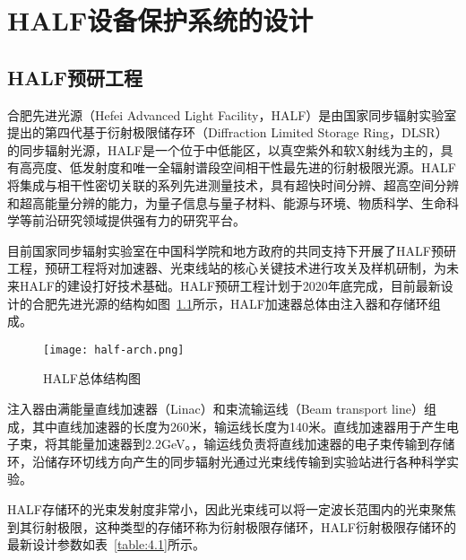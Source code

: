 
\chapter{HALF设备保护系统的设计}

\section{HALF预研工程}

合肥先进光源（Hefei Advanced Light Facility，HALF）是由国家同步辐射实验室提出的第四代基于衍射极限储存环（Diffraction Limited Storage Ring，DLSR）的同步辐射光源，HALF是一个位于中低能区，以真空紫外和软X射线为主的，具有高亮度、低发射度和唯一全辐射谱段空间相干性最先进的衍射极限光源。HALF将集成与相干性密切关联的系列先进测量技术，具有超快时间分辨、超高空间分辨和超高能量分辨的能力，为量子信息与量子材料、能源与环境、物质科学、生命科学等前沿研究领域提供强有力的研究平台。

目前国家同步辐射实验室在中国科学院和地方政府的共同支持下开展了HALF预研工程，预研工程将对加速器、光束线站的核心关键技术进行攻关及样机研制，为未来HALF的建设打好技术基础。HALF预研工程计划于2020年底完成，目前最新设计的合肥先进光源的结构如图~\ref{fig:half-arch}所示，HALF加速器总体由注入器和存储环组成。

\begin{figure}[!htb]
	\centering
	\texttt{[image: half-arch.png]}
	\caption{HALF总体结构图}
	\label{fig:half-arch}
\end{figure}

注入器由满能量直线加速器（Linac）和束流输运线（Beam transport line）组成，其中直线加速器的长度为260米，输运线长度为140米。直线加速器用于产生电子束，将其能量加速器到2.2GeV。，输运线负责将直线加速器的电子束传输到存储环，沿储存环切线方向产生的同步辐射光通过光束线传输到实验站进行各种科学实验。

HALF存储环的光束发射度非常小，因此光束线可以将一定波长范围内的光束聚焦到其衍射极限，这种类型的存储环称为衍射极限存储环，HALF衍射极限存储环的最新设计参数如表~\ref{table:4.1}所示。

